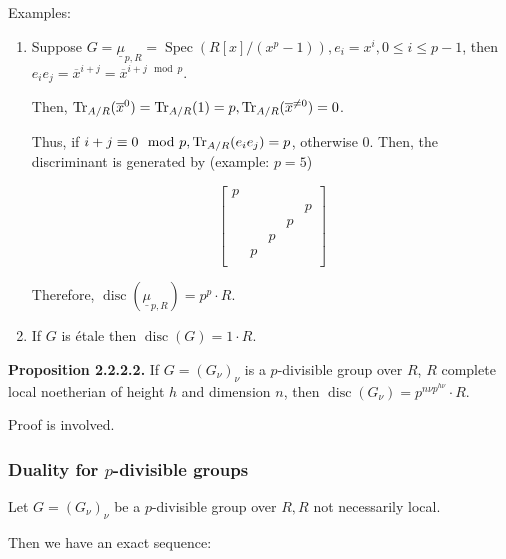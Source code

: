\documentclass{article}
\theoremstyle{definition}
\numberwithin{theorem}{subsection}
\begin{document}
    Examples:

    \begin{enumerate}[label=\arabic*)]
        \item Suppose \(G = \underline{\mu}_{p,R}  = \operatorname{Spec}\left( R[x] / (x^p - 1) \right), e_i = x^i, 0 \leq i \leq p-1\), then \(e_i e_j = \overline{x}^{i+j} = \overline{x}^{i + j \mod p}\).
        
        Then, \(\Tr_{A / R}(\overline{x}^0) = \Tr_{A / R}(1) = p, \Tr_{A / R}(\overline{x}^{\neq 0}) = 0\).
        
        Thus, if \(i+j \equiv 0 \mod p, \Tr_{A / R}(e_i e_j) = p\), otherwise \(0\). Then, the discriminant is generated by (example: \(p = 5\))

        \[
            \begin{bmatrix}
                p &  &  &  &  \\
                 &  &  &  & p \\
                 &  &  & p &  \\
                 &  & p &  &  \\
                 & p &  &  &  \\
            \end{bmatrix} 
        \]

        Therefore, \(\operatorname{disc}\left( \underline{\mu}_{p,R} \right) = p^p \cdot R\).
        
        \item If \(G\) is \'etale then \(\operatorname{disc}(G) = 1 \cdot R\).
    \end{enumerate} 

    \textbf{Proposition 2.2.2.2.} If \(G = (G_\nu)_\nu\) is  a \(p\)-divisible group over \(R\), \(R\) complete local noetherian of height \(h\) and dimension \(n\), then \(\operatorname{disc}(G_\nu) = p^{n\nu p^{h \nu}}\cdot R\). 

    Proof is involved.

    \subsubsection{Duality for \(p\)-divisible groups}

    Let \(G = (G_\nu)_\nu\) be a \(p\)-divisible group over \(R, R\) not necessarily local.

    Then we have an exact sequence:

    \begin{center}
    \end{center}
\end{document}
